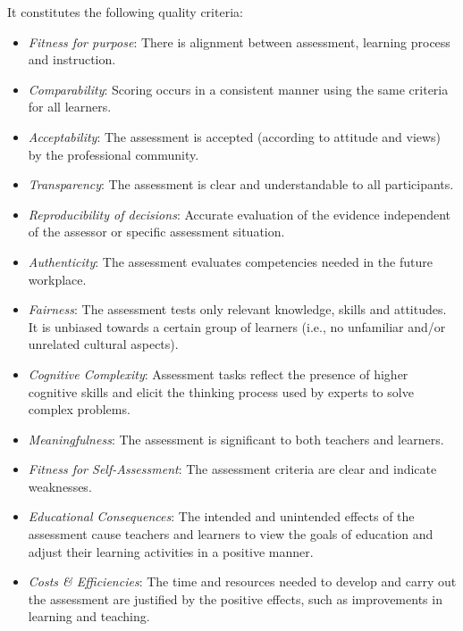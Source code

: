 It constitutes the following quality criteria:

\begin{itemize}
\item \emph{Fitness for purpose}: There is alignment between assessment, learning process and instruction.

\item \emph{Comparability}: Scoring occurs in a consistent manner using the same criteria for all learners.

\item \emph{Acceptability}: The assessment is accepted (according to attitude and views) by the professional community.

\item \emph{Transparency}: The assessment is clear and understandable to all participants. 

\item \emph{Reproducibility of decisions}: Accurate evaluation of the evidence independent of the assessor or specific assessment situation. 

\item \emph{Authenticity}: The assessment evaluates competencies needed in the future workplace.

\item \emph{Fairness}: The assessment tests only relevant knowledge, skills and attitudes. It is unbiased towards a certain group of learners (i.e., no unfamiliar and/or unrelated cultural aspects).

\item \emph{Cognitive Complexity}: Assessment tasks reflect the presence of higher cognitive skills and elicit the thinking process used by experts to solve complex problems.

\item \emph{Meaningfulness}: The assessment is significant to both teachers and learners. 

\item \emph{Fitness for Self-Assessment}: The assessment criteria are clear and indicate weaknesses.

\item \emph{Educational Consequences}: The intended and unintended effects of the assessment cause teachers and learners to view the goals of education and adjust their learning activities in a positive manner.

\item \emph{Costs \& Efficiencies}: The time and resources needed to develop and carry out the assessment are justified by the positive effects, such as improvements in learning and teaching.

\end{itemize}



